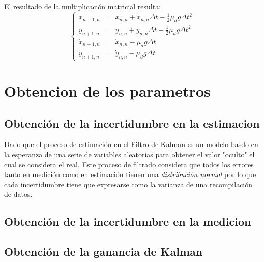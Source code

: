 El resultado de la multiplicación matricial resulta:
\begin{equation}
\left\{\begin{matrix}
x_{n+1, n} = & x_{n,n} + \dot{x}_{n,n} \Delta t - \frac{1}{2} \mu_d g \Delta t^2\\ 
y_{n+1, n} = & y_{n,n} + \dot{y}_{n,n} \Delta t - \frac{1}{2} \mu_d g \Delta t^2\\ 
\dot{x}_{n+1, n} = & \dot{x}_{n,n} - \mu_d g \Delta t\\ 
\dot{y}_{n+1, n} = &\dot{y}_{n,n} - \mu_d g \Delta t 
\end{matrix}\right.
\end{equation}
	
	\section{Obtencion de los parametros}
		\subsection*{Obtención de la incertidumbre en la estimacion}
	Dado que el proceso de estimación en el Filtro de Kalman es un modelo basdo en la esperanza de una serie de variables aleatorias para obtener el valor "oculto" el cual se considera el real. Este proceso de filtrado considera que todos los errores tanto en medición como en estimación tienen una \textit{distribución normal} por lo que cada incertidumbre tiene que expresarse como la varianza de una recompilación de datos.	
		\subsection*{Obtención de la incertidumbre en la medicion}
		\subsection*{Obtención de la ganancia de Kalman}